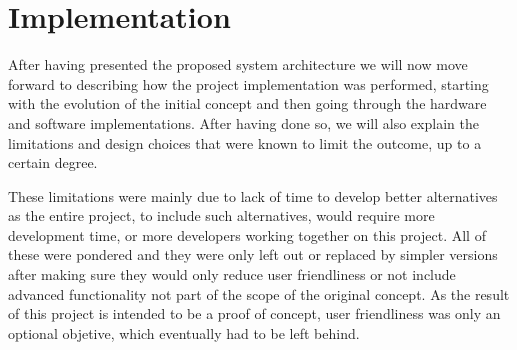 \chapter{Implementation} \label{chap:impl}

After having presented the proposed system architecture we will now move forward to describing how the project implementation was performed, starting with the evolution of the initial concept and then going through the hardware and software implementations.
After having done so, we will also explain the limitations and design choices that were known to limit the outcome, up to a certain degree.

These limitations were mainly due to lack of time to develop better alternatives as the entire project, to include such alternatives, would require more development time, or more developers working together on this project.
All of these were pondered and they were only left out or replaced by simpler versions after making sure they would only reduce user friendliness or not include advanced functionality not part of the scope of the original concept.
As the result of this project is intended to be a proof of concept, user friendliness was only an optional objetive, which eventually had to be left behind.












